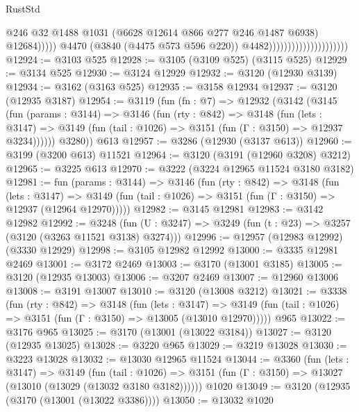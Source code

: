 \begin{lexlean}{RustStd}
\begin{coremodule}
{\begin{coremodule}
{{{{{{{{{{{{{{{{{{{{{{{{{{                                                        @246
                                                        @32
                                                        @1488
                                                        @1031
                                                        (@6628 @12614 @866 @277 @246 @1487 @6938)
                                                        @12684)))))
                                              @4470
                                              (@3840 (@4475 @573 @596 @220))
                                              @4482)))))))))))))))))))))
@12924 := @3103 @525
@12928 := @3105 (@3109 @525) (@3115 @525)
@12929 := @3134 @525
@12930 := @3124 @12929
@12932 := @3120 (@12930 @3139)
@12934 := @3162 (@3163 @525)
@12935 := @3158 @12934
@12937 := @3120 (@12935 @3187)
@12954 := @3119
    (fun (fn : @7) =>
    @12932
      (@3142
        (@3145
          (fun (params : @3144) =>
          @3146
            (fun (rty : @842) =>
            @3148
              (fun (lets : @3147) =>
              @3149 (fun (tail : @1026) => @3151 (fun (Γ : @3150) => @12937 @3234))))))
        @3280))
    @613
@12957 := @3286 (@12930 (@3137 @613))
@12960 := @3199 (@3200 @613) @11521
@12964 := @3120 (@3191 (@12960 @3208) @3212)
@12965 := @3225 @613
@12970 := @3222 (@3224 @12965 @11524 @3180 @3182)
@12981 := fun (params : @3144) =>
  @3146
    (fun (rty : @842) =>
    @3148
      (fun (lets : @3147) =>
      @3149 (fun (tail : @1026) => @3151 (fun (Γ : @3150) => @12937 (@12964 @12970)))))
@12982 := @3145 @12981
@12983 := @3142 @12982
@12992 := @3248
    (fun (U : @3247) => @3249 (fun (t : @23) => @3257 (@3120 (@3263 @11521 @3138) @3274)))
@12996 := @12957 (@12983 @12992) (@3330 @12929)
@12998 := @3105 @12982 @12992
@13000 := @3335 @12981 @2469
@13001 := @3172 @2469
@13003 := @3170 (@13001 @3185)
@13005 := @3120 (@12935 @13003)
@13006 := @3207 @2469
@13007 := @12960 @13006
@13008 := @3191 @13007
@13010 := @3120 (@13008 @3212)
@13021 := @3338
    (fun (rty : @842) =>
    @3148
      (fun (lets : @3147) =>
      @3149 (fun (tail : @1026) => @3151 (fun (Γ : @3150) => @13005 (@13010 @12970)))))
    @965
@13022 := @3176 @965
@13025 := @3170 (@13001 (@13022 @3184))
@13027 := @3120 (@12935 @13025)
@13028 := @3220 @965
@13029 := @3219 @13028
@13030 := @3223 @13028
@13032 := @13030 @12965 @11524
@13044 := @3360
    (fun (lets : @3147) =>
    @3149
      (fun (tail : @1026) =>
      @3151 (fun (Γ : @3150) => @13027 (@13010 (@13029 (@13032 @3180 @3182))))))
    @1020
@13049 := @3120 (@12935 (@3170 (@13001 (@13022 @3386))))
@13050 := @13032 @1020
}}}}}}}}}}}}}}}}}}}}}}}}}}
\end{coremodule}}
\end{coremodule}
\end{lexlean}
